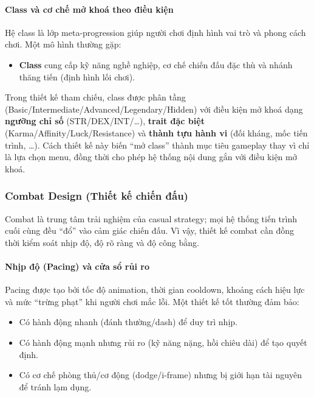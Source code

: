 \paragraph{Class và cơ chế mở khoá theo điều kiện}
Hệ class là lớp meta-progression giúp người chơi định hình vai trò và phong cách chơi. Một mô hình thường gặp:
\begin{itemize}
    \item \textbf{Class} cung cấp kỹ năng nghề nghiệp, cơ chế chiến đấu đặc thù và nhánh thăng tiến (định hình lối chơi).
\end{itemize}
Trong thiết kế tham chiếu, class được phân tầng (Basic/\allowbreak Intermediate/\allowbreak Advanced/\allowbreak Legendary/\allowbreak Hidden) với điều kiện mở khoá dạng \textbf{ngưỡng chỉ số} (STR/\allowbreak DEX/\allowbreak INT/\ldots), \textbf{trait đặc biệt} (Karma/\allowbreak Affinity/\allowbreak Luck/\allowbreak Resistance) và \textbf{thành tựu hành vi} (đối kháng, mốc tiến trình, \ldots). Cách thiết kế này biến ``mở class'' thành mục tiêu gameplay thay vì chỉ là lựa chọn menu, đồng thời cho phép hệ thống nội dung gắn với điều kiện mở khoá.

\subsubsection{Combat Design (Thiết kế chiến đấu)}

Combat là trung tâm trải nghiệm của casual strategy; mọi hệ thống tiến trình cuối cùng đều ``đổ'' vào cảm giác chiến đấu\cite{adams-game-design,schell-art}. Vì vậy, thiết kế combat cần đồng thời kiểm soát nhịp độ, độ rõ ràng và độ công bằng.

\paragraph{Nhịp độ (Pacing) và cửa sổ rủi ro}
Pacing được tạo bởi tốc độ animation, thời gian cooldown, khoảng cách hiệu lực và mức ``trừng phạt'' khi người chơi mắc lỗi. Một thiết kế tốt thường đảm bảo:
\begin{itemize}
    \item Có hành động nhanh (đánh thường/\allowbreak dash) để duy trì nhịp.
    \item Có hành động mạnh nhưng rủi ro (kỹ năng nặng, hồi chiêu dài) để tạo quyết định.
    \item Có cơ chế phòng thủ/\allowbreak cơ động (dodge/\allowbreak i-frame) nhưng bị giới hạn tài nguyên để tránh lạm dụng.
\end{itemize}

